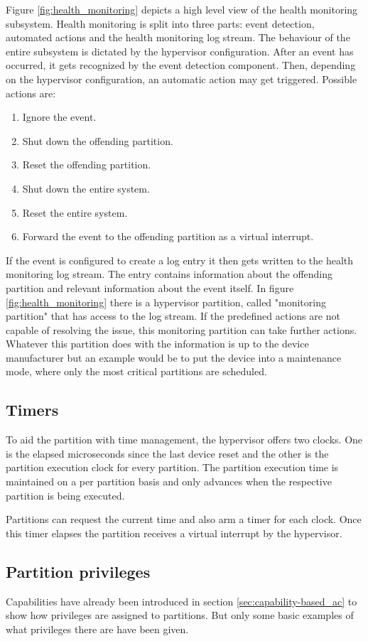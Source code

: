 Figure \ref{fig:health_monitoring} depicts a high level view of the health monitoring subsystem. Health monitoring is split into three parts: event detection, automated actions and the health monitoring log stream. The behaviour of the entire subsystem is dictated by the hypervisor configuration.
After an event has occurred, it gets recognized by the event detection component. Then, depending on the hypervisor configuration, an automatic action may get triggered. Possible actions are:
\begin{enumerate}
    \item Ignore the event.
    \item Shut down the offending partition.
    \item Reset the offending partition.
    \item Shut down the entire system.
    \item Reset the entire system.
    \item Forward the event to the offending partition as a virtual interrupt.
\end{enumerate}

If the event is configured to create a log entry it then gets written to the health monitoring log stream. The entry contains information about the offending partition and relevant information about the event itself. In figure \ref{fig:health_monitoring} there is a hypervisor partition, called "monitoring partition" that has access to the log stream. If the predefined actions are not capable of resolving the issue, this monitoring partition can take further actions. Whatever this partition does with the information is up to the device manufacturer but an example would be to put the device into a maintenance mode, where only the most critical partitions are scheduled. 

\subsection{Timers}
To aid the partition with time management, the hypervisor offers two clocks. One is the elapsed microseconds since the last device reset and the other is the partition execution clock for every partition. The partition execution time is maintained on a per partition basis and only advances when the respective partition is being executed.

Partitions can request the current time and also arm a timer for each clock. Once this timer elapses the partition receives a virtual interrupt by the hypervisor. 
\subsection{Partition privileges}
Capabilities have already been introduced in section \ref{sec:capability-based_ac} to show how privileges are assigned to partitions. But only some basic examples of what privileges there are have been given. 

